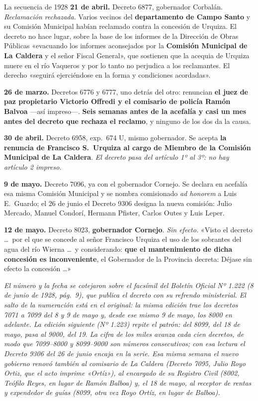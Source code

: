 \begin{ficha}{La secuencia de 1928}
\textbf{21 de abril.} Decreto 6877, gobernador Corbalán. \textit{Reclamación rechazada.}
Varios vecinos del \textbf{departamento de Campo Santo} y su Comisión Municipal habían
reclamado contra la concesión de Urquiza. El decreto no hace lugar, sobre la base de los
informes de la Dirección de Obras Públicas «evacuando los informes aconsejados por la
\textbf{Comisión Municipal de La Caldera} y el señor Fiscal General», que sostienen que la
acequia de Urquiza muere en el río Vaqueros y por lo tanto no perjudica a los reclamantes.
El derecho «seguirá ejerciéndose en la forma y condiciones acordadas».

\textbf{26 de marzo.} Decretos 6776 y 6777, uno detrás del otro: renuncian \textbf{el juez de paz
propietario Victorio Offredi y el comisario de policía Ramón Balvoa} ---así impreso---.
\textbf{Seis semanas antes de la acefalía y casi un mes antes del decreto que rechaza el
reclamo}, y ninguno de los dos da la causa.

\textbf{30 de abril.} Decreto 6958, exp.\ 674 U, mismo gobernador. Se acepta \textbf{la renuncia de
Francisco S.\ Urquiza al cargo de Miembro de la Comisión Municipal de La Caldera}. \textit{El decreto pasa del artículo 1º al 3º: no hay artículo 2 impreso.}

\textbf{9 de mayo.} Decreto 7096, ya con el gobernador Cornejo. Se declara en acefalía esa misma Comisión Municipal y se nombra comisionado \textit{ad honorem} a Luis E.\ Guardo; el 26 de junio el Decreto 9306 designa la nueva comisión: Julio Mercado, Manuel Condorí, Hermann Pfister, Carlos Outes y Luis Leper.

\textbf{12 de mayo.} Decreto 8023, \textbf{gobernador Cornejo}. \textit{Sin efecto.}
«Visto el decreto \ldots\ por el que se concede al señor Francisco Urquiza el uso de los
sobrantes del agua del río Wierna \ldots\ y considerando: \textbf{que el mantenimiento de
dicha concesión es inconveniente}, el Gobernador de la Provincia decreta: Déjase sin
efecto la concesión \ldots»
\end{ficha}

\textit{El número y la fecha se cotejaron sobre el facsímil del Boletín Oficial Nº 1.222 (8 de junio de 1928, pág.~9), que publica el decreto con su refrendo ministerial. El salto de la numeración está en el original: la misma edición trae los decretos 7071 a 7099 del 8 y 9 de mayo y, desde ese mismo 9 de mayo, los 8000 en adelante. La edición siguiente (Nº 1.223) repite el patrón: del 8099, del 18 de mayo, pasa al 9000, del 19. La cifra de los miles avanza cada cien decretos, de modo que 7099--8000 y 8099--9000 son números consecutivos; con esa lectura el Decreto 9306 del 26 de junio encaja en la serie. Esa misma semana el nuevo gobierno renovó también al comisario de La Caldera (Decreto 7095, Julio Royo Ortiz, que el acto imprime «Ortíz»), al encargado de su Registro Civil (8002, Teófilo Reyes, en lugar de Ramón Balboa) y, el 18 de mayo, al receptor de rentas y expendedor de guías (8099, otra vez Royo Ortíz, en lugar de Balboa).}

